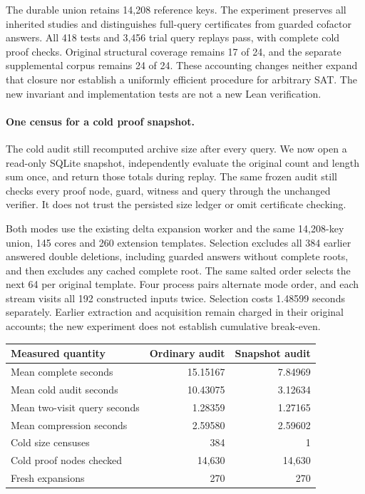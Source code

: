 \documentclass[11pt,a4paper]{article}
\numberwithin{equation}{section}
\theoremstyle{plain}
\theoremstyle{definition}
\theoremstyle{remark}
\begin{document}
The durable union retains 14,208 reference keys. The experiment preserves all
inherited studies and distinguishes full-query certificates from guarded
cofactor answers. All 418 tests and 3,456 trial query replays pass, with complete
cold proof checks. Original structural coverage remains 17 of 24, and the
separate supplemental corpus remains 24 of 24. These accounting changes neither
expand that closure nor establish a uniformly efficient procedure for arbitrary
SAT. The new invariant and implementation tests are not a new Lean verification.

\paragraph{One census for a cold proof snapshot.}
The cold audit still recomputed archive size after every query. We now open a
read-only SQLite snapshot, independently evaluate the original count and length
sum once, and return those totals during replay. The same frozen audit still
checks every proof node, guard, witness and query through the unchanged verifier.
It does not trust the persisted size ledger or omit certificate checking.

Both modes use the existing delta expansion worker and the same 14,208-key
union, 145 cores and 260 extension templates. Selection excludes all 384 earlier
answered double deletions, including guarded answers without complete roots,
and then excludes any cached complete root. The same salted order selects the
next 64 per original template. Four process pairs alternate mode order, and
each stream visits all 192 constructed inputs twice. Selection costs 1.48599
seconds separately. Earlier extraction and acquisition remain charged in their
original accounts; the new experiment does not establish cumulative break-even.

\begin{center}
\begin{tabular}{lrr}
\hline
Measured quantity & Ordinary audit & Snapshot audit \\
\hline
Mean complete seconds & 15.15167 & 7.84969 \\
Mean cold audit seconds & 10.43075 & 3.12634 \\
Mean two-visit query seconds & 1.28359 & 1.27165 \\
Mean compression seconds & 2.59580 & 2.59602 \\
Cold size censuses & 384 & 1 \\
Cold proof nodes checked & 14,630 & 14,630 \\
Fresh expansions & 270 & 270 \\
\hline
\end{tabular}
\end{center}
\end{document}
